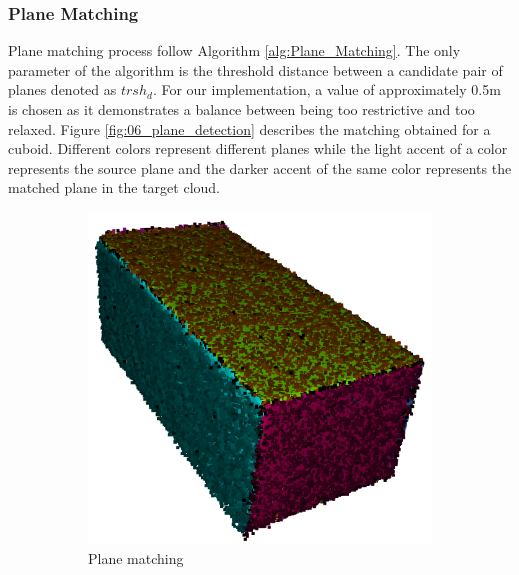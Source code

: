\subsubsection{Plane Matching}
Plane matching process follow Algorithm \ref{alg:Plane_Matching}. The only parameter of the algorithm is the threshold distance between a candidate pair of planes denoted as $trsh_d$. 
For our implementation, a value of approximately 0.5m is chosen as it demonstrates a balance between being too restrictive and too relaxed. Figure \ref{fig:06_plane_detection} describes the matching obtained for a cuboid. Different colors represent different planes while the light accent of a color represents the source plane and the darker accent of the same color represents the matched plane in the target cloud. 

\begin{figure}
    \begin{subfigure}{.48\linewidth}
    \centering
    \includegraphics[scale=0.4]{Img/06_plane_matching0.png}
    \caption{Plane matching}
    \label{fig:06_plane_matching}
    \end{subfigure}
    \begin{subfigure}{.48\linewidth}
    \centering

\end{subfigure}
\end{figure}
